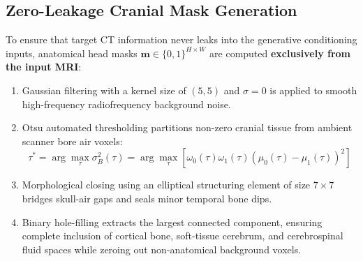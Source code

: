 \subsection{Zero-Leakage Cranial Mask Generation}
To ensure that target CT information never leaks into the generative conditioning inputs, anatomical head masks $\mathbf{m} \in \{0, 1\}^{H \times W}$ are computed \textbf{exclusively from the input MRI}:
\begin{enumerate}
    \item Gaussian filtering with a kernel size of $(5, 5)$ and $\sigma = 0$ is applied to smooth high-frequency radiofrequency background noise.
    \item Otsu automated thresholding partitions non-zero cranial tissue from ambient scanner bore air voxels:
    \begin{equation}
    \tau^* = \arg\max_\tau \sigma_B^2(\tau) = \arg\max_\tau \left[ \omega_0(\tau) \omega_1(\tau) \left( \mu_0(\tau) - \mu_1(\tau) \right)^2 \right]
    \label{eq:otsu_threshold}
    \end{equation}
    \item Morphological closing using an elliptical structuring element of size $7 \times 7$ bridges skull-air gaps and seals minor temporal bone dips.
    \item Binary hole-filling extracts the largest connected component, ensuring complete inclusion of cortical bone, soft-tissue cerebrum, and cerebrospinal fluid spaces while zeroing out non-anatomical background voxels.
\end{enumerate}

